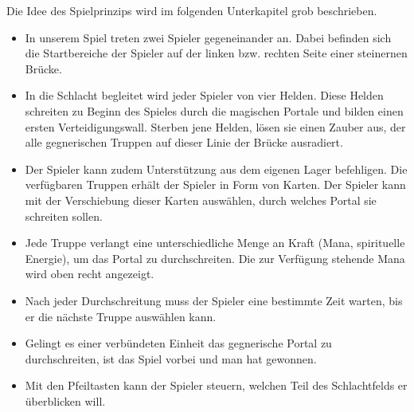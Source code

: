 Die Idee des Spielprinzips wird im folgenden Unterkapitel grob beschrieben.\
\begin{itemize}
    \item In unserem Spiel treten zwei Spieler gegeneinander an. Dabei befinden sich die Startbereiche der Spieler auf der linken bzw. rechten Seite einer steinernen Brücke.
    \item In die Schlacht begleitet wird jeder Spieler von vier Helden. Diese Helden schreiten zu Beginn des Spieles durch die magischen Portale und bilden einen ersten Verteidigungswall.
    Sterben jene Helden, lösen sie einen Zauber aus, der alle gegnerischen Truppen auf dieser Linie der Brücke ausradiert.
    \item Der Spieler kann zudem Unterstützung aus dem eigenen Lager befehligen. Die verfügbaren Truppen erhält der Spieler in Form von Karten. Der Spieler kann mit der Verschiebung dieser Karten auswählen, durch welches Portal sie schreiten sollen.
    \item Jede Truppe verlangt eine unterschiedliche Menge an Kraft (Mana, spirituelle Energie), um das Portal zu durchschreiten. Die zur Verfügung stehende Mana wird oben recht angezeigt.
    \item Nach jeder Durchschreitung muss der Spieler eine bestimmte Zeit warten, bis er die nächste Truppe auswählen kann.
    \item Gelingt es einer verbündeten Einheit das gegnerische Portal zu durchschreiten, ist das Spiel vorbei und man hat gewonnen. 
    \item Mit den Pfeiltasten kann der Spieler steuern, welchen Teil des Schlachtfelds er überblicken will.
\end{itemize}



